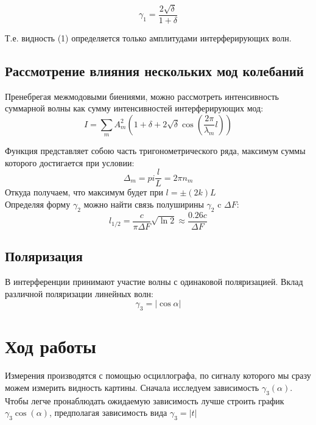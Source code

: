 \documentclass[12pt,a4paper]{article}
\begin{document}
\[ \gamma_1 = \frac{2\sqrt{\delta}}{1+\delta} \]

Т.е. видность (1) определяется только амплитудами интерферирующих волн.\\
\subsection{Рассмотрение влияния нескольких мод колебаний}
Пренебрегая межмодовыми биениями, можно рассмотреть интенсивность суммарной волны как сумму интенсивностей интерферирующих мод:
\[I = \sum \limits_{m} A^2_m(1+\delta + 2\sqrt{\delta} \cos ( \frac{2 \pi}{\lambda_m} l)) \]

Функция представляет собою часть тригонометрического ряда, максимум суммы которого достигается при условии:
\[ \Delta_m  =  pi \frac{l}{L} = 2 \pi n_m \]
Откуда получаем, что максимум будет при $l = \pm (2k) L$\\

Определяя форму $\gamma_2$ можно найти связь полуширины $\gamma_2$ c $\Delta F$:
\[ l_{1/2} = \frac{c}{\pi \Delta F} \sqrt{\ln 2} \approx \frac{0.26 c}{\Delta F} \]

\subsection{Поляризация}

В интерференции принимают участие волны с одинаковой поляризацией. Вклад различной поляризации линейных волн:
\[\gamma_3 = | \cos \alpha| \]

\section{Ход работы}
Измерения производятся с помощью осциллографа, по сигналу которого мы сразу можем измерить видность картины. Сначала исследуем зависимость $\gamma_3 (\alpha)$. Чтобы легче пронаблюдать ожидаемую зависимость лучше строить график $\gamma_3 \cos (\alpha)$, предполагая зависимость вида $\gamma_3 = |t|$\\
\end{document}
